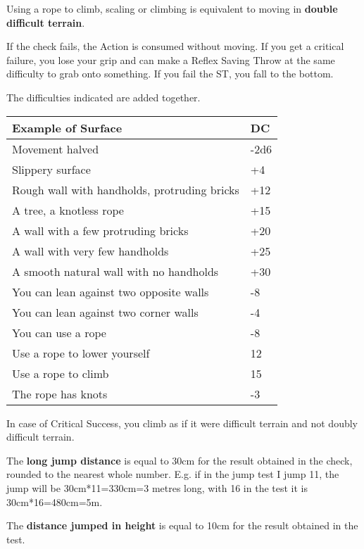\documentclass[landscape,10pt,a4paper]{article}
\begin{document}
\begin{multicols}{3}
\begin{dmbox}[title=Climbing/Climbing - page \pageref{climbing}]
Using a rope to climb, scaling or climbing is equivalent to moving in \textbf{double difficult terrain}.

If the check fails, the Action is consumed without moving. If you get a critical failure, you lose your grip and can make a Reflex Saving Throw at the same difficulty to grab onto something. If you fail the ST, you fall to the bottom.

The difficulties indicated are added together.

\medskip

\noindent\begin{tabularx}{1\linewidth}{Xl}
\textbf{Example of Surface} & \textbf{DC}\\
\toprule
Movement halved & -2d6\\
Slippery surface&+4\\
Rough wall with handholds, protruding bricks&+12\\
A tree, a knotless rope&+15\\
A wall with a few protruding bricks &+20\\
A wall with very few handholds&+25\\
A smooth natural wall with no handholds&+30\\
You can lean against two opposite walls&-8\\
You can lean against two corner walls&-4\\
You can use a rope&-8\\
\midrule
Use a rope to lower yourself&12\\
Use a rope to climb&15\\
The rope has knots & -3\\
\end{tabularx}

\medskip

In case of Critical Success, you climb as if it were difficult terrain and not doubly difficult terrain.

\end{dmbox}

\begin{dmbox}[title=Athletics - page \pageref{athletics}]

The \textbf{long jump distance} is equal to 30cm for the result obtained in the check, rounded to the nearest whole number. E.g. if in the jump test I jump 11, the jump will be 30cm*11=330cm=3 metres long, with 16 in the test it is 30cm*16=480cm=5m.

The \textbf{distance jumped in height} is equal to 10cm for the result obtained in the test.


\end{dmbox}
\end{multicols}
\end{document}
